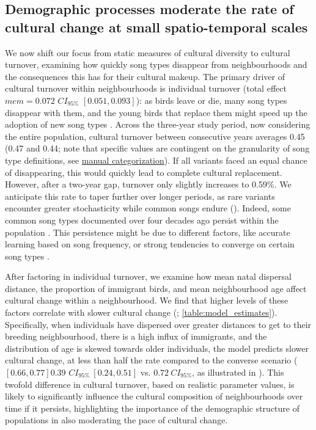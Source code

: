 \documentclass[9pt, onecolumn, twoside, lineno]{gsajnl}
\begin{document}
\subsection{Demographic processes moderate the rate of cultural change at small spatio-temporal scales}

We now shift our focus from static measures of cultural diversity to cultural turnover, examining how quickly song types disappear from neighbourhoods and the consequences this has for their cultural makeup. The primary driver of cultural turnover within neighbourhoods is individual turnover (total effect $mem = 0.072$ $CI_{95\%}$ $[0.051, 0.093]$): as birds leave or die, many song types disappear with them, and the young birds that replace them might speed up the adoption of new song types \autocite{dyble2024}. Across the three-year study period, now considering the entire population, cultural turnover between consecutive years averages 0.45 (0.47 and 0.44; note that specific values are contingent on the granularity of song type definitions, see \hyperref[sc:manual-categorization]{manual categorization}). If all variants faced an equal chance of disappearing, this would quickly lead to complete cultural replacement. However, after a two-year gap, turnover only slightly increases to 0.59\%. We anticipate this rate to taper further over longer periods, as rare variants encounter greater stochasticity while common songs endure (). Indeed, some common song types documented over four decades ago persist within the population \autocite{mcgregor1982b, keen2020}. This persistence might be due to different factors, like accurate learning based on song frequency, or strong tendencies to converge on certain song types \autocite{lachlan2018, tchernichovski2021, james2017, claidiere2007}.

After factoring in individual turnover, we examine how mean natal dispersal distance, the proportion of immigrant birds, and mean neighbourhood age affect cultural change within a neighbourhood. We find that higher levels of these factors correlate with slower cultural change  (; \autoref{table:model_estimates}). Specifically, when individuals have dispersed over greater distances to get to their breeding neighbourhood, there is a high influx of immigrants, and the distribution of age is skewed towards older individuals, the model predicts slower cultural change, at less than half the rate compared to the converse scenario ($[0.66, 0.77]$$0.39$ $CI_{95\%}~[0.24, 0.51]$ vs. $0.72~CI_{95\%}$, as illustrated in ). This twofold difference in cultural turnover, based on realistic parameter values, is likely to significantly influence the cultural composition of neighbourhoods over time if it persists, highlighting the importance of the demographic structure of populations in also moderating the pace of cultural change.
\end{document}
